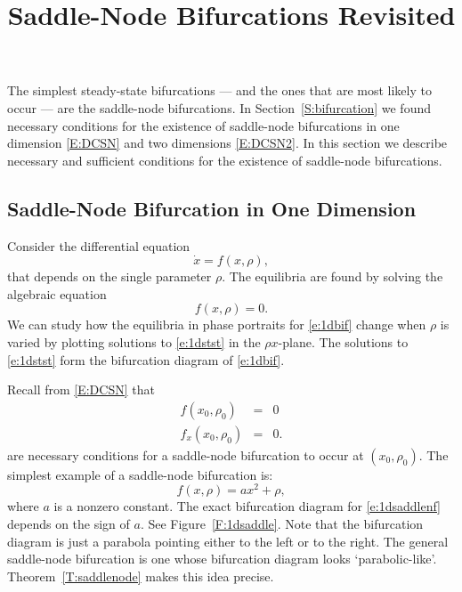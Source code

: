 \documentclass{ximera}
\title{Saddle-Node Bifurcations Revisited}
\begin{document}
\begin{abstract}
\end{abstract}
\maketitle


\label{S:SNB}
  


The simplest steady-state bifurcations --- and the ones that are most
likely to occur --- are the saddle-node bifurcations.  In 
Section~\ref{S:bifurcation} we found necessary conditions for the existence 
of saddle-node bifurcations in one dimension \eqref{E:DCSN} and two 
dimensions \eqref{E:DCSN2}.  In this section we describe necessary and 
sufficient conditions for the existence of saddle-node bifurcations.


\subsection*{Saddle-Node Bifurcation in One Dimension}

Consider the differential equation 
\begin{equation} \label{e:1dbif}
\dot{x} = f(x,\rho),
\end{equation}
that depends on the single parameter $\rho$.  The equilibria are 
found by solving the algebraic equation 
\begin{equation} \label{e:1dstst}
f(x,\rho) = 0.
\end{equation}
We can study how the equilibria in phase portraits for \eqref{e:1dbif} 
change when $\rho$ is varied by plotting
solutions to \eqref{e:1dstst} in the $\rho x$-plane.  The solutions to
\eqref{e:1dstst} form the bifurcation diagram of \eqref{e:1dbif}.

Recall from \eqref{E:DCSN} that  
\begin{equation}  \label{e:1dbifcond}
\begin{array}{rcl}
f(x_0,\rho_0) & = & 0 \\
f_x(x_0,\rho_0) & = & 0.
\end{array}
\end{equation}
are necessary conditions for a saddle-node bifurcation to occur at
$(x_0,\rho_0)$.  The simplest example of a saddle-node bifurcation is:
\begin{equation}  \label{e:1dsaddlenf}
f(x,\rho) = a x^2 + \rho,
\end{equation}
where $a$ is a nonzero constant.  The exact bifurcation diagram for 
\eqref{e:1dsaddlenf} depends on the sign of $a$.  See Figure~\ref{F:1dsaddle}.  
Note that the bifurcation diagram is just a parabola pointing either to the 
left or to the right.  The general saddle-node bifurcation is one whose 
bifurcation diagram looks `parabolic-like'.  Theorem~\ref{T:saddlenode}
makes this idea precise.
\end{document}
